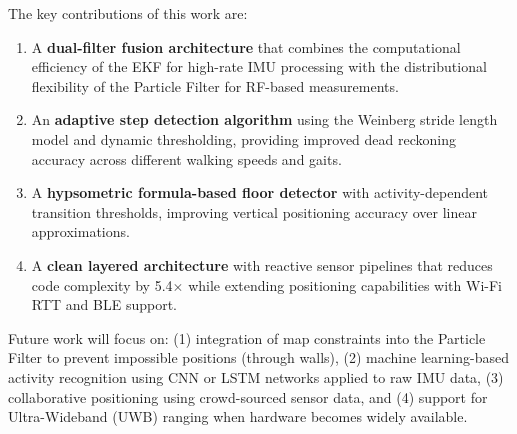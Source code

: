\documentclass[journal,twocolumn]{IEEEtran}
\begin{document}
The key contributions of this work are:
\begin{enumerate}
    \item A \textbf{dual-filter fusion architecture} that combines the computational efficiency of the EKF for high-rate IMU processing with the distributional flexibility of the Particle Filter for RF-based measurements.
    \item An \textbf{adaptive step detection algorithm} using the Weinberg stride length model and dynamic thresholding, providing improved dead reckoning accuracy across different walking speeds and gaits.
    \item A \textbf{hypsometric formula-based floor detector} with activity-dependent transition thresholds, improving vertical positioning accuracy over linear approximations.
    \item A \textbf{clean layered architecture} with reactive sensor pipelines that reduces code complexity by 5.4$\times$ while extending positioning capabilities with Wi-Fi RTT and BLE support.
\end{enumerate}

Future work will focus on: (1) integration of map constraints into the Particle Filter to prevent impossible positions (through walls), (2) machine learning-based activity recognition using CNN or LSTM networks applied to raw IMU data, (3) collaborative positioning using crowd-sourced sensor data, and (4) support for Ultra-Wideband (UWB) ranging when hardware becomes widely available.
\end{document}
